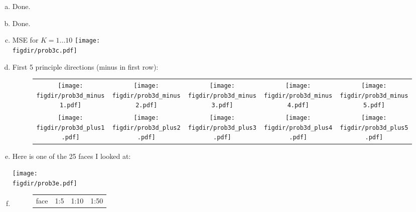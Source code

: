 \documentclass[twoside,11pt]{article}
\newcommand{\figdir}{figs}
\theoremstyle{definition}
\begin{document}
\begin{enumerate}[(a)]

\item Done.
\item Done.

\item MSE for $K=1...10$
\texttt{[image: \\figdir/prob3c.pdf]}

\item First 5 principle directions (minus in first row):
\begin{figure}[h!] \centering
\begin{tabular}{ccccc}
\hspace{-.5in}\texttt{[image: \\figdir/prob3d\_minus1.pdf]} &
\hspace{-.5in}\texttt{[image: \\figdir/prob3d\_minus2.pdf]} &
\hspace{-.5in}\texttt{[image: \\figdir/prob3d\_minus3.pdf]} &
\hspace{-.5in}\texttt{[image: \\figdir/prob3d\_minus4.pdf]} &
\hspace{-.5in}\texttt{[image: \\figdir/prob3d\_minus5.pdf]} \\
\hspace{-.5in}\texttt{[image: \\figdir/prob3d\_plus1.pdf]} &
\hspace{-.5in}\texttt{[image: \\figdir/prob3d\_plus2.pdf]} &
\hspace{-.5in}\texttt{[image: \\figdir/prob3d\_plus3.pdf]} &
\hspace{-.5in}\texttt{[image: \\figdir/prob3d\_plus4.pdf]} &
\hspace{-.5in}\texttt{[image: \\figdir/prob3d\_plus5.pdf]} \\
\end{tabular}
\end{figure}

\vspace{6in}

\item Here is one of the 25 faces I looked at:

\texttt{[image: \\figdir/prob3e.pdf]}

\item
\begin{figure}[h!] \centering
\begin{tabular}{cccc}
face & 1:5 & 1:10 & 1:50 \\


\end{tabular}
\end{figure}
\end{enumerate}
\end{document}
